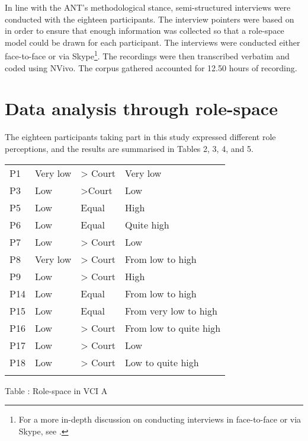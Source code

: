 \documentclass[output=paper]{langsci/langscibook}
\begin{document}
In line with the ANT’s methodological stance, semi-structured interviews were conducted with the eighteen participants. The interview pointers were based on  in order to ensure that enough information was collected so that a role-space model could be drawn for each participant. The interviews were conducted either face-to-face or via Skype\footnote{For a more in-depth discussion on conducting interviews in face-to-face or via Skype, see \citet{Devaux2017b}.}. The recordings were then transcribed verbatim and coded using NVivo. The corpus gathered accounted for 12.50 hours of recording. 

\section{Data analysis through role-space}

The eighteen participants taking part in this study expressed different role perceptions, and the results are summarised in Tables 2, 3, 4, and 5.

\begin{tabularx}{\textwidth}{XXXX}
\lsptoprule
P1 & Very low & > Court & Very low\\
P3 & Low & >Court & Low\\
P5 & Low & Equal & High\\
P6 & Low & Equal & Quite high \\
P7 & Low & > Court & Low\\
P8 & Very low & > Court & From low to high\\
P9 & Low & > Court & High\\
P14 & Low & Equal & From low to high\\
P15 & Low & Equal & From very low to high\\
P16 & Low & > Court & From low to quite high\\
P17 & Low & > Court & Low\\
P18 & Low & > Court & Low to quite high\\
\lspbottomrule
\end{tabularx}
\begin{stylecaption}
Table : Role-space in VCI A
\end{stylecaption}
\end{document}
